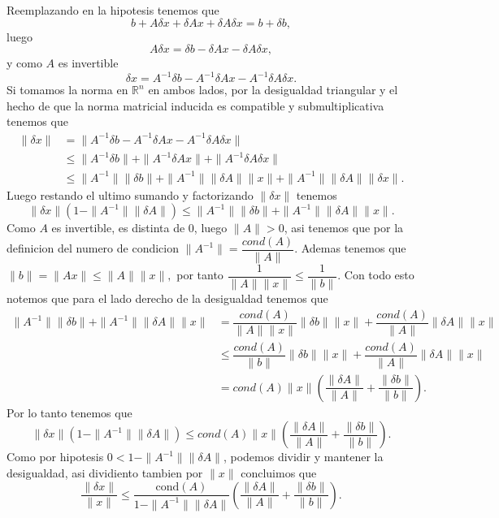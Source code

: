 \begin{sproof}
     Reemplazando en la hipotesis tenemos que
     $$b+A\delta x+\delta Ax+\delta A\delta x=b+\delta b,$$
     luego
     $$A\delta x=\delta b-\delta Ax-\delta A\delta x,$$
     y como $A$ es invertible
     $$\delta x=A^{-1}\delta b-A^{-1}\delta Ax-A^{-1}\delta A\delta x.$$
     Si tomamos la norma en $\mathbb{R}^n$ en ambos lados, por la desigualdad triangular y el hecho de que la norma matricial inducida es compatible y submultiplicativa tenemos que
     \begin{align*}
     \|\delta x\|&=\|A^{-1}\delta b-A^{-1}\delta Ax-A^{-1}\delta A\delta x\|\\
     &\leq \|A^{-1}\delta b\|+\|A^{-1}\delta Ax\|+\|A^{-1}\delta A\delta x\|\\
     &\leq \|A^{-1}\|\|\delta b\|+\|A^{-1}\|\|\delta A\|\|x\|+\|A^{-1}\|\|\delta A\|\|\delta x\|.
     \end{align*}
     Luego restando el ultimo sumando y factorizando $\|\delta x\|$ tenemos
     $$\|\delta x\|(1-\|A^{-1}\|\|\delta A\|)\leq \|A^{-1}\|\|\delta b\|+\|A^{-1}\|\|\delta A\|\|x\|. $$
     Como $A$ es invertible, es distinta de 0, luego $\|A\|>0$, asi tenemos que por la definicion del numero de condicion $\|A^{-1}\|=\dfrac{cond(A)}{\|A\|}.$ Ademas tenemos que $\|b\|=\|Ax\|\leq\|A\|\|x\|,$ por tanto $\dfrac{1}{\|A\|\|x\|}\leq\dfrac{1}{\|b\|}.$ Con todo esto notemos que para el lado derecho de la desigualdad tenemos que
     \begin{align*}
       \|A^{-1}\|\|\delta b\|+\|A^{-1}\|\|\delta A\|\|x\|&=\dfrac{cond(A)}{\|A\|\|x\|}\|\delta b\|\|x\|+\dfrac{cond(A)}{\|A\|}\|\delta A\|\|x\|\\
       &\leq\dfrac{cond(A)}{\|b\|}\|\delta b\|\|x\|+\dfrac{cond(A)}{\|A\|}\|\delta A\|\|x\|\\
       &=cond(A)\|x\|\left(\dfrac{\|\delta A\|}{\|A\|}+\dfrac{\|\delta b\|}{\|b\|}\right).
     \end{align*}
     Por lo tanto tenemos que
     $$\|\delta x\|(1-\|A^{-1}\|\|\delta A\|)\leq cond(A)\|x\|\left(\dfrac{\|\delta A\|}{\|A\|}+\dfrac{\|\delta b\|}{\|b\|}\right).$$
     Como por hipotesis $0<1-\|A^{-1}\|\|\delta A\|$, podemos dividir y mantener la desigualdad, asi dividiento tambien por $\|x\|$ concluimos que
     $$\frac{\|\delta x\|}{\|x\|} \leq \frac{\text{cond}(A)}{1 - \|A^{-1}\| \|\delta A\|} \left( \frac{\|\delta A\|}{\|A\|} + \frac{\|\delta b\|}{\|b\|} \right).$$ 
    



\end{sproof}